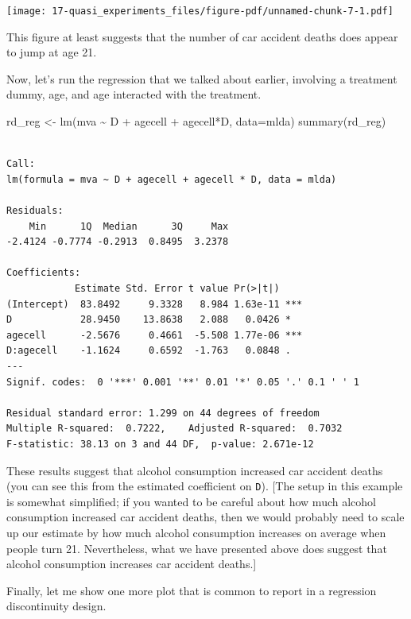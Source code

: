 \documentclass[
  letterpaper,
  DIV=11,
  numbers=noendperiod]{scrreprt}
\newenvironment{Shaded}{\begin{snugshade}}{\end{snugshade}}
\newcommand{\AttributeTok}[1]{\textcolor[rgb]{0.40,0.45,0.13}{#1}}
\newcommand{\FunctionTok}[1]{\textcolor[rgb]{0.28,0.35,0.67}{#1}}
\newcommand{\NormalTok}[1]{\textcolor[rgb]{0.00,0.23,0.31}{#1}}
\newcommand{\OtherTok}[1]{\textcolor[rgb]{0.00,0.23,0.31}{#1}}
\newcommand{\SpecialCharTok}[1]{\textcolor[rgb]{0.37,0.37,0.37}{#1}}
\begin{document}
\texttt{[image: 17-quasi\_experiments\_files/figure-pdf/unnamed-chunk-7-1.pdf]}

This figure at least suggests that the number of car accident deaths
does appear to jump at age 21.

Now, let's run the regression that we talked about earlier, involving a
treatment dummy, age, and age interacted with the treatment.

\begin{Shaded}
\begin{Highlighting}[]
\NormalTok{rd\_reg }\OtherTok{\textless{}{-}} \FunctionTok{lm}\NormalTok{(mva }\SpecialCharTok{\textasciitilde{}}\NormalTok{ D }\SpecialCharTok{+}\NormalTok{ agecell }\SpecialCharTok{+}\NormalTok{ agecell}\SpecialCharTok{*}\NormalTok{D, }\AttributeTok{data=}\NormalTok{mlda)}
\FunctionTok{summary}\NormalTok{(rd\_reg)}
\end{Highlighting}
\end{Shaded}

\begin{verbatim}

Call:
lm(formula = mva ~ D + agecell + agecell * D, data = mlda)

Residuals:
    Min      1Q  Median      3Q     Max 
-2.4124 -0.7774 -0.2913  0.8495  3.2378 

Coefficients:
            Estimate Std. Error t value Pr(>|t|)    
(Intercept)  83.8492     9.3328   8.984 1.63e-11 ***
D            28.9450    13.8638   2.088   0.0426 *  
agecell      -2.5676     0.4661  -5.508 1.77e-06 ***
D:agecell    -1.1624     0.6592  -1.763   0.0848 .  
---
Signif. codes:  0 '***' 0.001 '**' 0.01 '*' 0.05 '.' 0.1 ' ' 1

Residual standard error: 1.299 on 44 degrees of freedom
Multiple R-squared:  0.7222,    Adjusted R-squared:  0.7032 
F-statistic: 38.13 on 3 and 44 DF,  p-value: 2.671e-12
\end{verbatim}

These results suggest that alcohol consumption increased car accident
deaths (you can see this from the estimated coefficient on \texttt{D}).
{[}The setup in this example is somewhat simplified; if you wanted to be
careful about how much alcohol consumption increased car accident
deaths, then we would probably need to scale up our estimate by how much
alcohol consumption increases on average when people turn 21.
Nevertheless, what we have presented above does suggest that alcohol
consumption increases car accident deaths.{]}

Finally, let me show one more plot that is common to report in a
regression discontinuity design.
\end{document}
